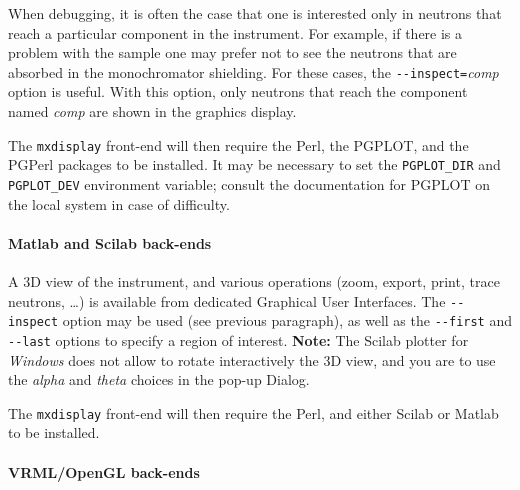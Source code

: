 When debugging, it is often the case that one is interested only in
neutrons that reach a particular component in the instrument. For
example, if there is a problem with the sample one may prefer not to see
the neutrons that are absorbed in the monochromator shielding. For these
cases, the \verb+--inspect=+\textit{comp\/} option is useful. With this
option, only neutrons that reach the component named \textit{comp\/} are
shown in the graphics display.


The \verb+mxdisplay+ front-end will then require the Perl, the PGPLOT, and the
PGPerl packages to be installed. It may be necessary to set the
\verb+PGPLOT_DIR+ and \verb+PGPLOT_DEV+ environment variable; consult the
documentation for PGPLOT on the local system in case of difficulty.
  

\paragraph{Matlab and Scilab back-ends}

A 3D view of the instrument, and various operations (zoom, export, print, trace neutrons, \ldots) is available from dedicated Graphical User Interfaces.
The \verb+--inspect+ option may be used (see previous paragraph), as well as the \verb+--first+ and \verb+--last+ options to specify a region of interest. {\bfseries Note:} The Scilab plotter for \emph{Windows} does not allow to rotate interactively the 3D view, and you are to use the \emph{alpha} and \emph{theta} choices in the pop-up Dialog.

The \verb+mxdisplay+ front-end will then
require the Perl, and either Scilab or Matlab to be installed.  

\paragraph{VRML/OpenGL back-ends}

